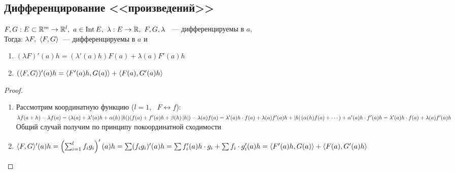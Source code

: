 \documentclass[../main.tex]{subfiles}
\begin{document}
\subsection{Дифференцирование <<произведений>>}
\begin{lemma}
$F, G: E \subset \mathbb{R}^m \rightarrow \mathbb{R}^l, \ a \in \operatorname*{Int} E, \ \lambda: E \rightarrow \mathbb{R}, \ F, G, \lambda$ ~--- дифференцируемы в $a$, \\
Тогда: $\lambda F, \ \langle F, G \rangle$~--- дифференцируемы в $a$ и
\begin{enumerate}
    \item
    $(\lambda F)'(a)h = (\lambda'(a)h)F(a) + \lambda(a) F'(a)h$
    \item 
    $(\langle F, G \rangle)'(a)h= \langle F'(a)h, G(a) \rangle + \langle F(a), G'(a)h \rangle$
\end{enumerate}
\end{lemma}
\begin{proof}
~

    \begin{enumerate}
        \item 
        Рассмотрим координатную функцию ($l=1$, \ $F \leftrightarrow f$):
        $\lambda f (a + h) - \lambda f(a) = (\lambda(a) + \lambda'(a)h + \alpha(h) \left| h \right|)(f(a) + f'(a)h + \beta(h) \left| h \right|) - \lambda(a)f(a) = \lambda'(a)h \cdot f(a) + \lambda(a) f'(a)h + \left| h \right| (\alpha(h)f(a) + \cdots) + \alpha'(a)h \cdot f'(a)h = \lambda'(a)h \cdot f(a) + \lambda(a) f'(a)h$ \\
        Общий случай получим по принципу покоординатной сходимости
        \item 
        $\langle F, G \rangle'(a)h = \left( \sum_{i = 1}^l f_i g_i \right)' (a) h = \sum (f_i g_i)'(a)h = \sum f_i'(a)h \cdot g_i + \sum f_i\cdot g_i'(a)h = \langle F'(a)h, G(a) \rangle + \langle F(a), G'(a)h \rangle$
    \end{enumerate}
\end{proof}
\newpage
\end{document}
